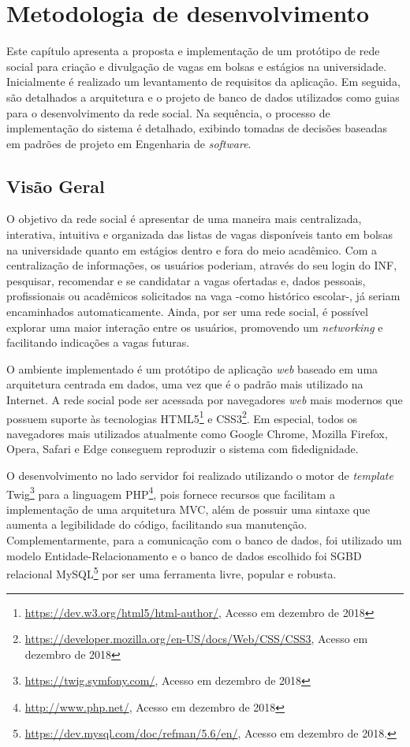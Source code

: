 \chapter{Metodologia de desenvolvimento}
\label{metodologiaDesenvolvimento}
Este capítulo apresenta a proposta e implementação de um protótipo de rede social para criação e divulgação de vagas em bolsas e estágios na universidade. Inicialmente é realizado um levantamento de requisitos da aplicação. Em seguida, são detalhados a arquitetura e o projeto de banco de dados utilizados como guias para o desenvolvimento da rede social. Na sequência, o processo de implementação do sistema é detalhado, exibindo tomadas de decisões baseadas em padrões de projeto em Engenharia de \textit{software}.

\section{Visão Geral}
\label{metodologiaVisaoGeral}
O objetivo da rede social é apresentar de uma maneira mais centralizada, interativa, intuitiva e organizada das listas de vagas disponíveis tanto em bolsas na universidade quanto em estágios dentro e fora do meio acadêmico. Com a centralização de informações, os usuários poderiam, através do seu login do INF, pesquisar, recomendar e se candidatar a vagas ofertadas e, dados pessoais, profissionais ou acadêmicos solicitados na vaga -como histórico escolar-, já seriam encaminhados automaticamente. Ainda, por ser uma rede social, é possível explorar uma maior interação entre os usuários, promovendo um \textit{networking} e facilitando indicações a vagas futuras.

O ambiente implementado é um protótipo de aplicação \textit{web} baseado em uma arquitetura centrada em dados, uma vez que é o padrão mais utilizado na Internet. A rede social pode ser acessada por navegadores \textit{web} mais modernos que possuem suporte às tecnologias HTML5\footnote{\url{https://dev.w3.org/html5/html-author/}, Acesso em dezembro de 2018} e CSS3\footnote{\url{https://developer.mozilla.org/en-US/docs/Web/CSS/CSS3}, Acesso em dezembro de 2018}. Em especial, todos os navegadores mais utilizados atualmente como Google Chrome, Mozilla Firefox, Opera, Safari e Edge conseguem reproduzir o sistema com fidedignidade.

O desenvolvimento no lado servidor foi realizado utilizando o motor de \textit{template} Twig\footnote{\url{https://twig.symfony.com/}, Acesso em dezembro de 2018} para a linguagem PHP\footnote{\url{http://www.php.net/}, Acesso em dezembro de 2018}, pois fornece recursos que facilitam a implementação de uma arquitetura MVC, além de possuir uma sintaxe que aumenta a legibilidade do código, facilitando sua manutenção. Complementarmente, para a comunicação com o banco de dados, foi utilizado um modelo Entidade-Relacionamento e o banco de dados escolhido foi SGBD relacional MySQL\footnote{\url{https://dev.mysql.com/doc/refman/5.6/en/}, Acesso em dezembro de 2018.} por ser uma ferramenta livre, popular e robusta.

